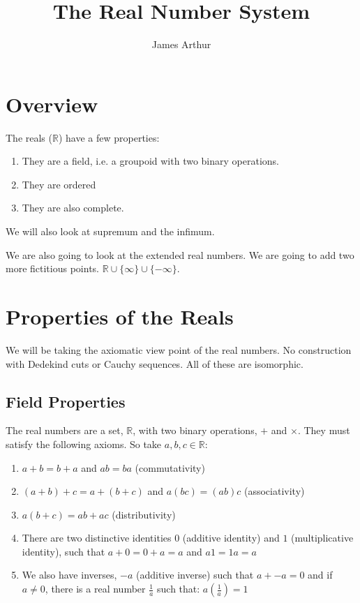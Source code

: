\documentclass{article}
\title{The Real Number System}
\author{James Arthur}
\newcommand{\R}{\mathbb{R}}
\begin{document}
\maketitle
\tableofcontents\newpage


\section{Overview}

The reals ($\R$) have a few properties:
\begin{enumerate}
  \item They are a field, i.e. a groupoid with {\color{blue}two binary operations}.
  \item They are ordered
  \item They are also {\color{blue}complete}.
\end{enumerate}
We will also look at {\color{blue}supremum} and the {\color{blue}infimum}.

We are also going to look at the {\color{blue}extended real numbers}. We are going to add two more fictitious points. $\R \cup \{ \infty \} \cup \{ -\infty \}$.

\section{Properties of the Reals}
We will be taking the axiomatic view point of the real numbers. No construction with {\color{blue}Dedekind cuts} or {\color{blue}Cauchy sequences}. All of these are isomorphic.

\subsection{Field Properties}
The real numbers are a set, $\R$, with two binary operations, $+$ and $\times$. They must satisfy the following axioms. So take $a, b, c \in \R$:
\begin{enumerate}
  \item $a + b = b + a$ and $ab = ba$ ({\color{blue}commutativity})
  \item $(a + b) + c = a + (b + c)$ and $a(bc) = (ab)c$ ({\color{blue}associativity})
  \item $a(b + c) = ab + ac$ ({\color{blue}distributivity})
  \item There are two distinctive identities $0$ ({\color{blue}additive identity}) and $1$ ({\color{blue}multiplicative identity}), such that $a + 0 = 0 + a = a$ and $a1 = 1a = a$
  \item We also have inverses, $-a$ ({\color{blue}additive inverse}) such that $a + -a = 0$ and if $a \neq 0$, there is a real number $\frac{1}{a}$ such that: $a(\frac{1}{a})=1$
\end{enumerate}
\end{document}
